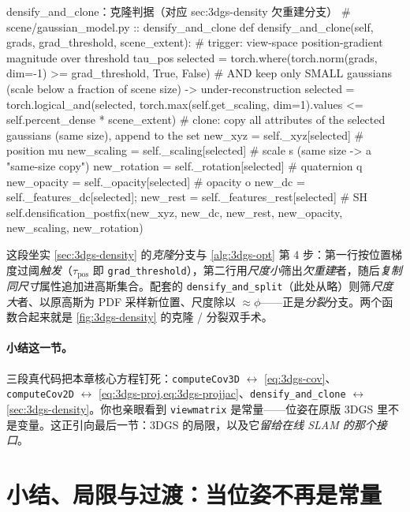 \begin{codebox}[Python]{densify\_and\_clone：克隆判据（对应 sec:3dgs-density 欠重建分支）}
# scene/gaussian_model.py :: densify_and_clone
def densify_and_clone(self, grads, grad_threshold, scene_extent):
    # trigger: view-space position-gradient magnitude over threshold tau_pos
    selected = torch.where(torch.norm(grads, dim=-1) >= grad_threshold, True, False)
    # AND keep only SMALL gaussians (scale below a fraction of scene size) -> under-reconstruction
    selected = torch.logical_and(selected,
        torch.max(self.get_scaling, dim=1).values <= self.percent_dense * scene_extent)
    # clone: copy all attributes of the selected gaussians (same size), append to the set
    new_xyz      = self._xyz[selected]        # position  mu
    new_scaling  = self._scaling[selected]    # scale  s   (same size -> a "same-size copy")
    new_rotation = self._rotation[selected]   # quaternion q
    new_opacity  = self._opacity[selected]    # opacity  o
    new_dc       = self._features_dc[selected]; new_rest = self._features_rest[selected]  # SH
    self.densification_postfix(new_xyz, new_dc, new_rest, new_opacity, new_scaling, new_rotation)
\end{codebox}

\noindent{}这段坐实 \cref{sec:3dgs-density} 的\emph{克隆}分支与 \cref{alg:3dgs-opt} 第 4 步：第一行按位置梯度过阈\emph{触发}（$\tau_{\mathrm{pos}}$ 即 \texttt{grad\_threshold}），第二行用\emph{尺度小}筛出\emph{欠重建}者，随后\emph{复制同尺寸}属性追加进高斯集合。配套的 \texttt{densify\_and\_split}（此处从略）则筛\emph{尺度大}者、以原高斯为 PDF 采样新位置、尺度除以 $\approx\phi$——正是\emph{分裂}分支。两个函数合起来就是 \cref{fig:3dgs-density} 的克隆 / 分裂双手术。

\paragraph{小结这一节。}
三段真代码把本章核心方程钉死：\texttt{computeCov3D} $\leftrightarrow$ \cref{eq:3dgs-cov}、\texttt{computeCov2D} $\leftrightarrow$ \cref{eq:3dgs-proj,eq:3dgs-projjac}、\texttt{densify\_and\_clone} $\leftrightarrow$ \cref{sec:3dgs-density}。你也亲眼看到 \texttt{viewmatrix} 是常量——位姿在原版 3DGS 里不是变量。这正引向最后一节：3DGS 的局限，以及它\emph{留给在线 SLAM 的那个接口}。

\section{小结、局限与过渡：当位姿不再是常量}
\label{sec:3dgs-limits}


